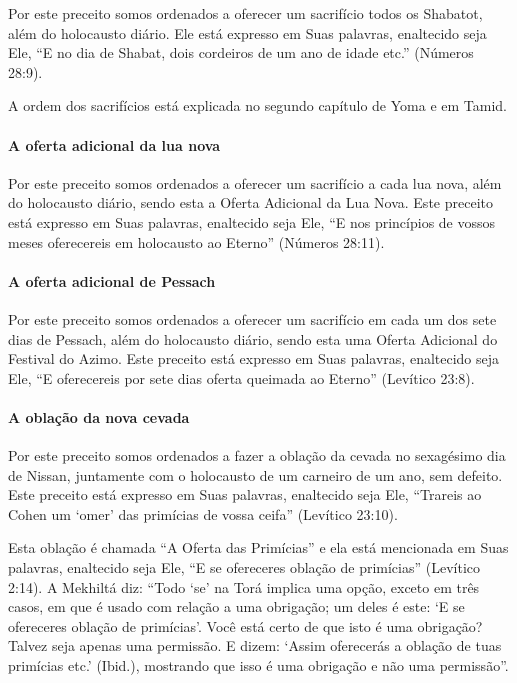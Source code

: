 Por este preceito somos ordenados a oferecer um sacrifício todos os
Shabatot, além do holocausto diário. Ele está expresso em Suas palavras,
enaltecido seja Ele, ``E no dia de Shabat, dois cordeiros de um ano de
idade etc.'' (Números 28:9).

A ordem dos sacrifícios está explicada no segundo capítulo de Yoma e em
Tamid.

\paragraph{A oferta adicional da lua nova}

Por este preceito somos ordenados a oferecer um sacrifício a cada lua
nova, além do holocausto diário, sendo esta a Oferta Adicional da Lua
Nova. Este preceito está expresso em Suas palavras, enaltecido seja
Ele, ``E nos princípios de vossos meses oferecereis em holocausto ao
Eterno'' (Números 28:11).

\paragraph{A oferta adicional de Pessach}

Por este preceito somos ordenados a oferecer um sacrifício em cada um
dos sete dias de Pessach, além do holocausto diário, sendo esta uma
Oferta Adicional do Festival do Azimo. Este preceito está expresso em
Suas palavras, enaltecido seja Ele, ``E oferecereis por sete dias
oferta queimada ao Eterno'' (Levítico 23:8).

\paragraph{A oblação da nova cevada}

Por este preceito somos ordenados a fazer a oblação da cevada no
sexagésimo dia de Nissan, juntamente com o holocausto de um carneiro de
um ano, sem defeito. Este preceito está expresso em Suas palavras,
enaltecido seja Ele, ``Trareis ao Cohen um `omer' das primícias de
vossa ceifa'' (Levítico 23:10).

Esta oblação é chamada ``A Oferta das Primícias'' e ela está mencionada
em Suas palavras, enaltecido seja Ele, ``E se ofereceres oblação de
primícias'' (Levítico 2:14). A Mekhiltá diz: ``Todo `se' na Torá
implica uma opção, exceto em três casos, em que é usado com relação a
uma obrigação; um deles é este: `E se ofereceres oblação de primícias'.
Você está certo de que isto é uma obrigação? Talvez seja apenas uma
permissão. E dizem: `Assim oferecerás a oblação de tuas primícias etc.'
(Ibid.), mostrando que isso é uma obrigação e não uma permissão''.

